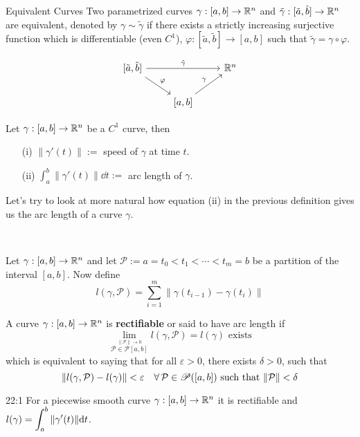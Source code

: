 \documentclass[../Analysis-3.tex]{subfiles}
\begin{document}
\begin{Def}{Equivalent Curves}{}
  Two parametrized curves $\gamma : [a,b] \to \mathbb{R}^n$ and $\tilde{\gamma} : [\tilde{a}, \tilde{b}] \to \mathbb{R}^n$ are equivalent, denoted by $\gamma \sim \tilde{\gamma}$ if there exists a strictly increasing surjective function which is differentiable (even $C^1$), $\varphi : [\tilde{a},\tilde{b}] \to [a,b]$ such that $\tilde{\gamma} = \gamma \circ \varphi$.

  \[\begin{tikzcd}
      {[\tilde{a}, \tilde{b}]} && {\R^n} \\
      & {[a, b]}
      \arrow["\varphi", from=1-1, to=2-2]
      \arrow["\gamma", from=2-2, to=1-3]
      \arrow["{\tilde{\gamma}}", from=1-1, to=1-3]
    \end{tikzcd}\]
\end{Def}

\begin{Def}{}{}
  Let $\gamma : [a,b] \to \mathbb{R}^n$ be a $C^1$ curve, then
  \begin{enumerate}
    \item[(i)] $\| \gamma'(t) \| :=$ speed of $\gamma$ at time $t$.
    \item[(ii)] $\displaystyle\int_a^b \| \gamma'(t) \| \dd t :=$ arc length of $\gamma$.
  \end{enumerate}
\end{Def}

Let's try to look at more natural how equation (ii) in the previous definition gives us the arc length of a curve $\gamma$.

\

Let $\gamma : [a,b] \to \mathbb{R}^n$ and let $\mathcal{P} := a = t_0 < t_1 < \cdots < t_m = b $ be a partition of the interval $[a,b]$. Now define
\[
  l(\gamma,\mathcal{P}) = \sum_{i=1}^m \| \gamma(t_{i-1}) - \gamma(t_i) \|
\]


\begin{Def}{}{}
  A curve $\gamma : [a,b] \to \mathbb{R}^n$ is \textbf{rectifiable} or said to have arc length if
  \[
    \lim_{\overset{\|\mathcal{P}\| \to 0}{\mathcal{P} \in \mathscr{P}[a,b]}} l(\gamma,\mathcal{P}) = l(\gamma) \mbox{ exists}
  \]
  which is equivalent to saying that for all $\varepsilon > 0$, there exists $\delta >0$, such that
  \[
    \norm{l(\gamma,\mathcal{P}) - l(\gamma)} < \varepsilon \quad \forall \, \mathcal{P} \in \mathscr{P}([a,b]) \mbox{ such that } \norm{\mathcal{P}} < \delta
  \]
\end{Def}

\begin{Thm}{}{22:1}
  For a piecewise smooth curve $\gamma : [a,b] \to \mathbb{R}^n$ it is rectifiable and $l(\gamma) = \displaystyle\int_a^b \norm{\gamma'(t)} \dd t $.
\end{Thm}
\end{document}
